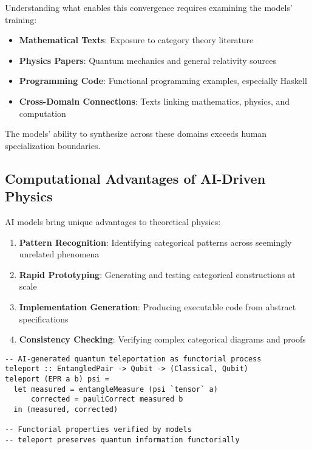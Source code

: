 Understanding what enables this convergence requires examining the models' training:

\begin{itemize}[leftmargin=*]
\item \textbf{Mathematical Texts}: Exposure to category theory literature
\item \textbf{Physics Papers}: Quantum mechanics and general relativity sources
\item \textbf{Programming Code}: Functional programming examples, especially Haskell
\item \textbf{Cross-Domain Connections}: Texts linking mathematics, physics, and computation
\end{itemize}

The models' ability to synthesize across these domains exceeds human specialization boundaries.

\subsection{Computational Advantages of AI-Driven Physics}

AI models bring unique advantages to theoretical physics:

\begin{enumerate}[leftmargin=*]
\item \textbf{Pattern Recognition}: Identifying categorical patterns across seemingly unrelated phenomena
\item \textbf{Rapid Prototyping}: Generating and testing categorical constructions at scale
\item \textbf{Implementation Generation}: Producing executable code from abstract specifications
\item \textbf{Consistency Checking}: Verifying complex categorical diagrams and proofs
\end{enumerate}

\begin{example}
\begin{verbatim}
-- AI-generated quantum teleportation as functorial process
teleport :: EntangledPair -> Qubit -> (Classical, Qubit)
teleport (EPR a b) psi = 
  let measured = entangleMeasure (psi `tensor` a)
      corrected = pauliCorrect measured b
  in (measured, corrected)
  
-- Functorial properties verified by models
-- teleport preserves quantum information functorially
\end{verbatim}
\end{example}

